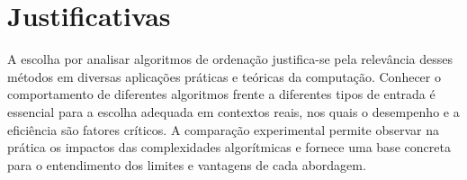 \section{Justificativas}
A escolha por analisar algoritmos de ordenação justifica-se pela relevância desses métodos em diversas aplicações práticas e teóricas da computação. Conhecer o comportamento de diferentes algoritmos frente a diferentes tipos de entrada é essencial para a escolha adequada em contextos reais, nos quais o desempenho e a eficiência são fatores críticos. A comparação experimental permite observar na prática os impactos das complexidades algorítmicas e fornece uma base concreta para o entendimento dos limites e vantagens de cada abordagem.
